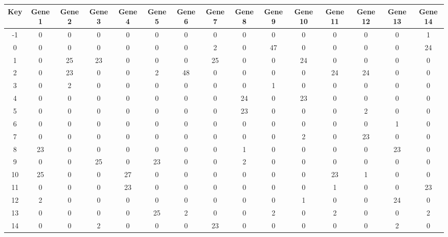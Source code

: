 \begin{tabular}{|c|c|c|c|c|c|c|c|c|c|c|c|c|c|c|}
\hline
Key & Gene 1 & Gene 2 & Gene 3 & Gene 4 & Gene 5 & Gene 6 & Gene 7 & Gene 8 & Gene 9 & Gene 10 & Gene 11 & Gene 12 & Gene 13 & Gene 14 \\
\hline
-1 & 0 & 0 & 0 & 0 & 0 & 0 & 0 & 0 & 0 & 0 & 0 & 0 & 0 & 1 \\
0 & 0 & 0 & 0 & 0 & 0 & 0 & 2 & 0 & 47 & 0 & 0 & 0 & 0 & 24 \\
1 & 0 & 25 & 23 & 0 & 0 & 0 & 25 & 0 & 0 & 24 & 0 & 0 & 0 & 0 \\
2 & 0 & 23 & 0 & 0 & 2 & 48 & 0 & 0 & 0 & 0 & 24 & 24 & 0 & 0 \\
3 & 0 & 2 & 0 & 0 & 0 & 0 & 0 & 0 & 1 & 0 & 0 & 0 & 0 & 0 \\
4 & 0 & 0 & 0 & 0 & 0 & 0 & 0 & 24 & 0 & 23 & 0 & 0 & 0 & 0 \\
5 & 0 & 0 & 0 & 0 & 0 & 0 & 0 & 23 & 0 & 0 & 0 & 2 & 0 & 0 \\
6 & 0 & 0 & 0 & 0 & 0 & 0 & 0 & 0 & 0 & 0 & 0 & 0 & 1 & 0 \\
7 & 0 & 0 & 0 & 0 & 0 & 0 & 0 & 0 & 0 & 2 & 0 & 23 & 0 & 0 \\
8 & 23 & 0 & 0 & 0 & 0 & 0 & 0 & 1 & 0 & 0 & 0 & 0 & 23 & 0 \\
9 & 0 & 0 & 25 & 0 & 23 & 0 & 0 & 2 & 0 & 0 & 0 & 0 & 0 & 0 \\
10 & 25 & 0 & 0 & 27 & 0 & 0 & 0 & 0 & 0 & 0 & 23 & 1 & 0 & 0 \\
11 & 0 & 0 & 0 & 23 & 0 & 0 & 0 & 0 & 0 & 0 & 1 & 0 & 0 & 23 \\
12 & 2 & 0 & 0 & 0 & 0 & 0 & 0 & 0 & 0 & 1 & 0 & 0 & 24 & 0 \\
13 & 0 & 0 & 0 & 0 & 25 & 2 & 0 & 0 & 2 & 0 & 2 & 0 & 0 & 2 \\
14 & 0 & 0 & 2 & 0 & 0 & 0 & 23 & 0 & 0 & 0 & 0 & 0 & 2 & 0 \\
\hline
\end{tabular}